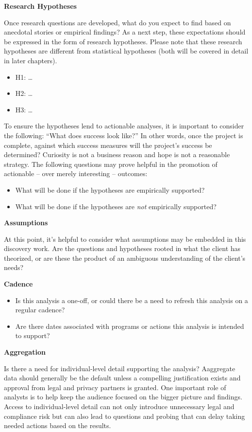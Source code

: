\documentclass[]{book}
\providecommand{\tightlist}{%
  \setlength{\itemsep}{0pt}\setlength{\parskip}{0pt}}
\begin{document}
\textbf{Research Hypotheses}

Once research questions are developed, what do you expect to find based on anecdotal stories or empirical findings? As a next step, these expectations should be expressed in the form of research hypotheses. Please note that these research hypotheses are different from statistical hypotheses (both will be covered in detail in later chapters).

\begin{itemize}
\tightlist
\item
  H1: \ldots{}
\item
  H2: \ldots{}
\item
  H3: \ldots{}
\end{itemize}

To ensure the hypotheses lend to actionable analyses, it is important to consider the following: ``What does success look like?'' In other words, once the project is complete, against which success measures will the project's success be determined? Curiosity is not a business reason and hope is not a reasonable strategy. The following questions may prove helpful in the promotion of actionable -- over merely interesting -- outcomes:

\begin{itemize}
\tightlist
\item
  What will be done if the hypotheses are empirically supported?
\item
  What will be done if the hypotheses are \emph{not} empirically supported?
\end{itemize}

\textbf{Assumptions}

At this point, it's helpful to consider what assumptions may be embedded in this discovery work. Are the questions and hypotheses rooted in what the client has theorized, or are these the product of an ambiguous understanding of the client's needs?

\textbf{Cadence}

\begin{itemize}
\tightlist
\item
  Is this analysis a one-off, or could there be a need to refresh this analysis on a regular cadence?
\item
  Are there dates associated with programs or actions this analysis is intended to support?
\end{itemize}

\textbf{Aggregation}

Is there a need for individual-level detail supporting the analysis? Aaggregate data should generally be the default unless a compelling justification exists and approval from legal and privacy partners is granted. One important role of analysts is to help keep the audience focused on the bigger picture and findings. Access to individual-level detail can not only introduce unnecessary legal and compliance risk but can also lead to questions and probing that can delay taking needed actions based on the results.
\end{document}
